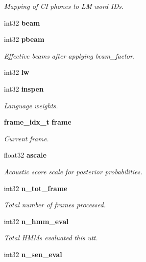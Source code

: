 \begin{DoxyCompactItemize}
\begin{DoxyCompactList}\small\item\em Mapping of C\+I phones to L\+M word I\+Ds. \end{DoxyCompactList}\item 
int32 {\bfseries beam}\label{structallphone__search__s_a8d99dcbcf48746431dd1b37c94b4839d}

\item 
int32 {\bf pbeam}\label{structallphone__search__s_af1c69cfc6361bfed4ed0726cbdd4fbfa}

\begin{DoxyCompactList}\small\item\em Effective beams after applying beam\+\_\+factor. \end{DoxyCompactList}\item 
int32 {\bfseries lw}\label{structallphone__search__s_ad2156dcb114cc598b55854ec1f139e81}

\item 
int32 {\bf inspen}\label{structallphone__search__s_ac4f20ffb4acb7c36a8e04cf7b88eafb2}

\begin{DoxyCompactList}\small\item\em Language weights. \end{DoxyCompactList}\item 
{\bf frame\+\_\+idx\+\_\+t} {\bf frame}
\begin{DoxyCompactList}\small\item\em Current frame. \end{DoxyCompactList}\item 
float32 {\bf ascale}
\begin{DoxyCompactList}\small\item\em Acoustic score scale for posterior probabilities. \end{DoxyCompactList}\item 
int32 {\bf n\+\_\+tot\+\_\+frame}\label{structallphone__search__s_a83712f4d89a500720b5bb3e8b2b67297}

\begin{DoxyCompactList}\small\item\em Total number of frames processed. \end{DoxyCompactList}\item 
int32 {\bf n\+\_\+hmm\+\_\+eval}\label{structallphone__search__s_a24d1b4b58c797ff488651b6238040433}

\begin{DoxyCompactList}\small\item\em Total H\+M\+Ms evaluated this utt. \end{DoxyCompactList}\item 
int32 {\bf n\+\_\+sen\+\_\+eval}\label{structallphone__search__s_a5759743790af0ec17f85f14f18004b71}


\end{DoxyCompactItemize}
